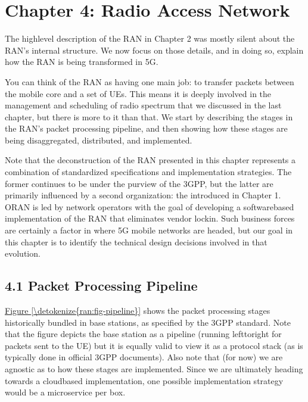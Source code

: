 \documentclass[a4paper,11pt,english]{sphinxmanual}
\begin{document}
\chapter{Chapter 4:  Radio Access Network}
\label{\detokenize{ran:chapter-4-radio-access-network}}\label{\detokenize{ran::doc}}
\sphinxAtStartPar
The high\sphinxhyphen{}level description of the RAN in Chapter 2 was mostly silent
about the RAN’s internal structure. We now focus on those details, and
in doing so, explain how the RAN is being transformed in 5G.

\sphinxAtStartPar
You can think of the RAN as having one main job: to transfer packets
between the mobile core and a set of UEs. This means it is deeply
involved in the management and scheduling of radio spectrum that we
discussed in the last chapter, but there is more to it than that. We
start by describing the stages in the RAN’s packet processing
pipeline, and then showing how these stages are being disaggregated,
distributed, and implemented.

\sphinxAtStartPar
Note that the deconstruction of the RAN presented in this chapter
represents a combination of standardized specifications and
implementation strategies. The former continues to be under the
purview of the 3GPP, but the latter are primarily influenced by a
second organization: the  introduced in
Chapter 1. O\sphinxhyphen{}RAN is led by network operators with the goal of
developing a software\sphinxhyphen{}based implementation of the RAN that eliminates
vendor lock\sphinxhyphen{}in. Such business forces are certainly a factor in where
5G mobile networks are headed, but our goal in this chapter is to
identify the technical design decisions involved in that evolution.


\section{4.1 Packet Processing Pipeline}
\label{\detokenize{ran:packet-processing-pipeline}}
\sphinxAtStartPar
\hyperref[\detokenize{ran:fig-pipeline}]{Figure \ref{\detokenize{ran:fig-pipeline}}} shows the packet processing stages
historically bundled in base stations, as specified by the 3GPP
standard. Note that the figure depicts the base station as a pipeline
(running left\sphinxhyphen{}to\sphinxhyphen{}right for packets sent to the UE) but it is equally
valid to view it as a protocol stack (as is typically done in official
3GPP documents). Also note that (for now) we are agnostic as to how
these stages are implemented. Since we are ultimately heading
towards a cloud\sphinxhyphen{}based implementation, one possible implementation
strategy would be a microservice per box.
\end{document}
